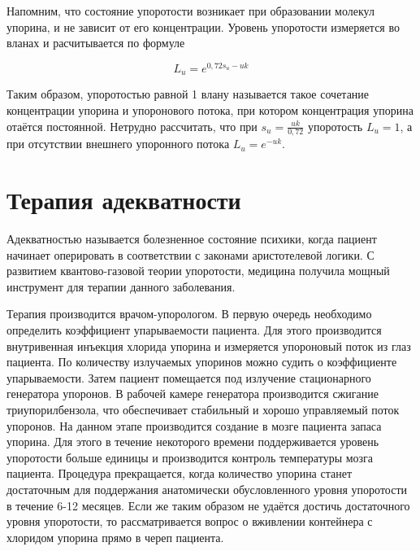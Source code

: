 \documentclass[a4paper,12pt]{article}
\begin{document}
Напомним, что состояние упоротости возникает при образовании молекул упорина, и не зависит от его концентрации. Уровень упоротости измеряется во вланах и расчитывается по формуле

\begin{equation}
L_{u}=e^{0,72s_{u}-uk}
\end{equation}

Таким образом, упоротостью равной 1 влану называется такое сочетание концентрации упорина и упоронового потока, при котором концентрация упорина отаётся постоянной. Нетрудно рассчитать, что при $s_{u}=\frac{uk}{0,72}$ упоротость $L_{u}=1$, а при отсутствии внешнего упоронного потока $L_{u}=e^{-uk}$.

\section{Терапия адекватности}

Адекватностью называется болезненное состояние психики, когда пациент начинает оперировать в соответствии с законами аристотелевой логики. С развитием квантово-газовой теории упоротости, медицина получила мощный инструмент для терапии данного заболевания.

Терапия производится врачом-упорологом. В первую очередь необходимо определить коэффициент упарываемости пациента. Для этого производится внутривенная инъекция хлорида упорина и измеряется упороновый поток из глаз пациента. По количеству излучаемых упоринов можно судить о коэффициенте упарываемости. Затем пациент помещается под излучение стационарного генератора упоронов. В рабочей камере генератора производится сжигание триупорилбензола, что обеспечивает стабильный и хорошо управляемый поток упоронов. На данном этапе производится создание в мозге пациента запаса упорина. Для этого в течение некоторого времени поддерживается уровень упоротости больше единицы и производится контроль температуры мозга пациента. Процедура прекращается, когда количество упорина станет достаточным для поддержания анатомически обусловленного уровня упоротости в течение 6-12 месяцев. Если же таким образом не удаётся достичь достаточного уровня упоротости, то рассматривается вопрос о вживлении контейнера с хлоридом упорина прямо в череп пациента.
\end{document}
